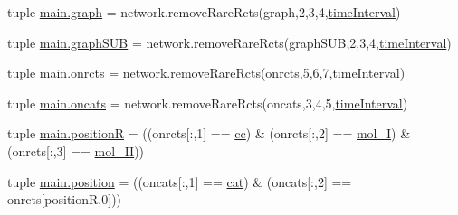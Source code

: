 \begin{DoxyCompactItemize}
\item 
tuple \hyperlink{a00111_a4cfdc01ecc5ad260a4f30c9353e3d856}{main.\-graph} = network.\-remove\-Rare\-Rcts(graph,2,3,4,\hyperlink{a00022_a430673c9821c17e4bf93cd42f59e00bb}{time\-Interval})
\item 
tuple \hyperlink{a00111_ab96de87bc8cbe59221256af996bdc43e}{main.\-graph\-S\-U\-B} = network.\-remove\-Rare\-Rcts(graph\-S\-U\-B,2,3,4,\hyperlink{a00022_a430673c9821c17e4bf93cd42f59e00bb}{time\-Interval})
\item 
tuple \hyperlink{a00111_ab26ffc3eda5d201a779d705813b06348}{main.\-onrcts} = network.\-remove\-Rare\-Rcts(onrcts,5,6,7,\hyperlink{a00022_a430673c9821c17e4bf93cd42f59e00bb}{time\-Interval})
\item 
tuple \hyperlink{a00111_ab4d380bc4bfcb970acc39ddf18a73972}{main.\-oncats} = network.\-remove\-Rare\-Rcts(oncats,3,4,5,\hyperlink{a00022_a430673c9821c17e4bf93cd42f59e00bb}{time\-Interval})
\item 
tuple \hyperlink{a00111_adbbdc0f6ad0f08400b3e492f7a807a6b}{main.\-position\-R} = ((onrcts\mbox{[}\-:,1\mbox{]} == \hyperlink{a00022_afb5980388a6e55ca55437b53cdaf528a}{cc}) \& (onrcts\mbox{[}\-:,2\mbox{]} == \hyperlink{a00022_ab346189eef5359a07ba32144ddcd4465}{mol\-\_\-\-I}) \& (onrcts\mbox{[}\-:,3\mbox{]} == \hyperlink{a00022_a4d2c086887289f8900b38ffa56854da3}{mol\-\_\-\-I\-I}))
\item 
tuple \hyperlink{a00111_ac67c60df3cc9afae7e4888d2b48b846d}{main.\-position} = ((oncats\mbox{[}\-:,1\mbox{]} == \hyperlink{a00022_a7073f71a43389f3032e69b1fffc2551a}{cat}) \& (oncats\mbox{[}\-:,2\mbox{]} == onrcts\mbox{[}position\-R,0\mbox{]}))
\end{DoxyCompactItemize}
